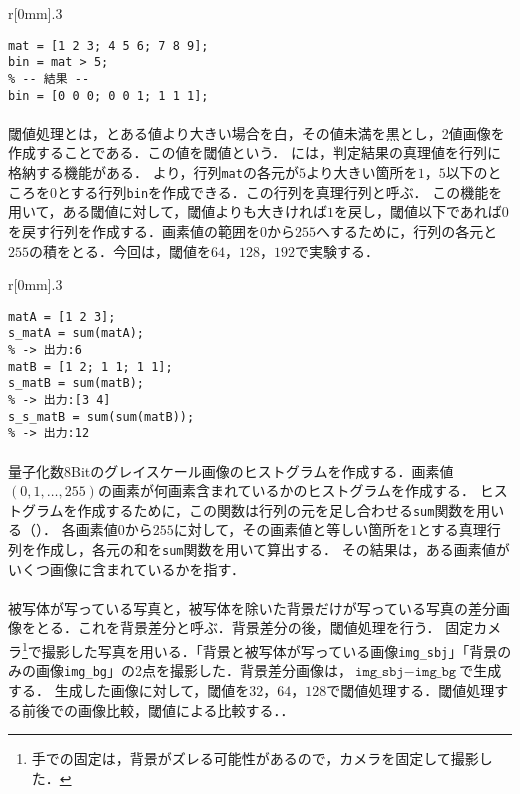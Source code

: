 \begin{wrapfigure}{r}[0mm]{.3\textwidth}
    \centering
    \vspace{-.7cm}
    \begin{lstlisting}[caption={判定結果の格納},label={src:判定結果の格納}]
mat = [1 2 3; 4 5 6; 7 8 9];
bin = mat > 5;
% -- 結果 --
bin = [0 0 0; 0 0 1; 1 1 1];     
    \end{lstlisting}
    \vspace{-.5cm}
\end{wrapfigure}
\paragraph{\kadaiad}
閾値処理とは，とある値より大きい場合を白，その値未満を黒とし，2値画像を作成することである．この値を閾値という．
\matlab には，判定結果の真理値を行列に格納する機能がある．
より，行列\texttt{mat}の各元が\(5\)より大きい箇所を\(1\)，\(5\)以下のところを\(0\)とする行列\texttt{bin}を作成できる．この行列を真理行列と呼ぶ．
この機能を用いて，ある閾値に対して，閾値よりも大きければ\(1\)を戻し，閾値以下であれば\(0\)を戻す行列を作成する．画素値の範囲を\(0\)から\(255\)へするために，行列の各元と\(255\)の積をとる．今回は，閾値を\(64\)，\(128\)，\(192\)で実験する．\scall{\kadaiad}

\begin{wrapfigure}{r}[0mm]{.3\textwidth}
    \centering
    \vspace{-1cm}
    \begin{lstlisting}[caption={\texttt{sum}関数},label={src:sum関数}]
matA = [1 2 3];
s_matA = sum(matA); 
% -> 出力:6
matB = [1 2; 1 1; 1 1];
s_matB = sum(matB); 
% -> 出力:[3 4]
s_s_matB = sum(sum(matB)); 
% -> 出力:12
    \end{lstlisting}
    \vspace{-.7cm}
\end{wrapfigure}
\paragraph{\kadaiae}
量子化数8Bitのグレイスケール画像のヒストグラムを作成する．画素値\((0,1,\dots ,255)\)の画素が何画素含まれているかのヒストグラムを作成する．
ヒストグラムを作成するために，この関数は行列の元を足し合わせる\texttt{sum}関数を用いる（）．
各画素値\(0\)から\(255\)に対して，その画素値と等しい箇所を\(1\)とする真理行列を作成し，各元の和を\texttt{sum}関数を用いて算出する．
その結果は，ある画素値がいくつ画像に含まれているかを指す．
\paragraph{\kadaiaf}
被写体が写っている写真と，被写体を除いた背景だけが写っている写真の差分画像をとる．これを背景差分と呼ぶ．背景差分の後，閾値処理を行う．
固定カメラ\footnote{手での固定は，背景がズレる可能性があるので，カメラを固定して撮影した．}で撮影した写真を用いる．「背景と被写体が写っている画像\texttt{img\_sbj}」「背景のみの画像\texttt{img\_bg}」の2点を撮影した．背景差分画像は，\(\texttt{img\_sbj}-\texttt{img\_bg}\)で生成する．
生成した画像に対して，閾値を\(32\)，\(64\)，\(128\)で閾値処理する．閾値処理する前後での画像比較，閾値による比較する．\scall{\kadaiaf}．

